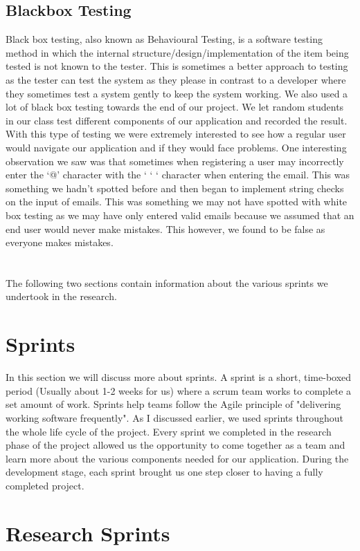 \subsection{Blackbox Testing}
Black box testing, also known as Behavioural Testing, is a software testing method in which the internal structure/design/implementation of the item being tested is not known to the tester. This is sometimes a better approach to testing as the tester can test the system as they please in contrast to a developer where they sometimes test a system gently to keep the system working. We also used a lot of black box testing towards the end of our project. We let random students in our class test different components of our application and recorded the result. With this type of testing we were extremely interested to see how a regular user would navigate our application and if they would face problems. One interesting observation we saw was that sometimes when registering a user may incorrectly enter the ‘@’ character with the ‘ ‘ ‘ character when entering the email. This was something we hadn’t spotted before and then began to implement string checks on the input of emails. This was something we may not have spotted with white box testing as we may have only entered valid emails because we assumed that an end user would never make mistakes. This however, we found to be false as everyone makes mistakes.
\\
\\
\\
The following two sections contain information about the various sprints we undertook in the research.

\section{Sprints} 
In this section we will discuss more about sprints. A sprint is a short, time-boxed period (Usually about 1-2 weeks for us) where a scrum team works to complete a set amount of work. Sprints help teams follow the Agile principle of "delivering working software frequently". As I discussed earlier, we used sprints throughout the whole life cycle of the project. Every sprint we completed in the research phase of the project allowed us the opportunity to come together as a team and learn more about the various components needed for our application. During the development stage, each sprint brought us one step closer to having a fully completed project.

\section{Research Sprints}
